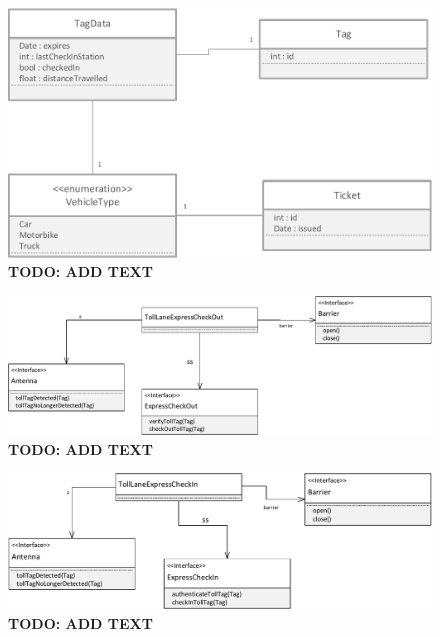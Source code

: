 \begin{figure}[H]
\centerline{\includegraphics[width=\textwidth]{img/class_diagrams/class_diagram_Tag_Ticket_VehicleType}}
\caption{\textbf{TODO: ADD TEXT}}
\label{fig:cld_ttvt}
\end{figure}

\begin{figure}[H]
\centerline{\includegraphics[width=\textwidth]{img/class_diagrams/class_diagram_toll_lane_express_check_in}}
\caption{\textbf{TODO: ADD TEXT}}
\label{fig:cld_tlei}
\end{figure}

\begin{figure}[H]
\centerline{\includegraphics[width=\textwidth]{img/class_diagrams/class_diagram_toll_lane_express_check_out}}
\caption{\textbf{TODO: ADD TEXT}}
\label{fig:cld_tleo}
\end{figure}

